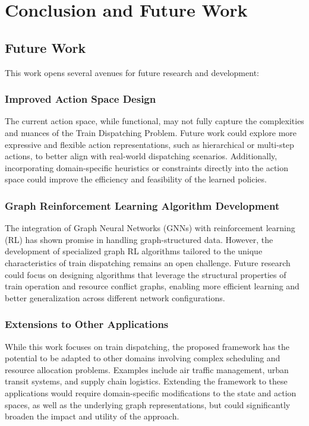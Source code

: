 \documentclass[runningheads]{llncs}
\begin{document}
\section{Conclusion and Future Work}
\label{sse:conclusion}

\subsection{Future Work}
\label{sss:future_work}
This work opens several avenues for future research and development:

\subsubsection{Improved Action Space Design}
The current action space, while functional, may not fully capture the complexities and nuances of the Train Dispatching Problem. 
Future work could explore more expressive and flexible action representations, such as hierarchical or multi-step actions, to better align with real-world dispatching scenarios. 
Additionally, incorporating domain-specific heuristics or constraints directly into the action space could improve the efficiency and feasibility of the learned policies.

\subsubsection{Graph Reinforcement Learning Algorithm Development}
The integration of Graph Neural Networks (GNNs) with reinforcement learning (RL) has shown promise in handling graph-structured data. 
However, the development of specialized graph RL algorithms tailored to the unique characteristics of train dispatching remains an open challenge. 
Future research could focus on designing algorithms that leverage the structural properties of train operation and resource conflict graphs, enabling more efficient learning and better generalization across different network configurations.

\subsubsection{Extensions to Other Applications}
While this work focuses on train dispatching, the proposed framework has the potential to be adapted to other domains involving complex scheduling and resource allocation problems. 
Examples include air traffic management, urban transit systems, and supply chain logistics. 
Extending the framework to these applications would require domain-specific modifications to the state and action spaces, as well as the underlying graph representations, but could significantly broaden the impact and utility of the approach.
\end{document}
